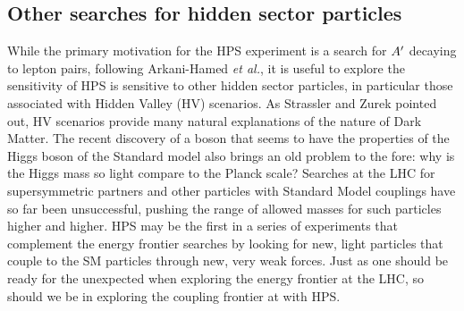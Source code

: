 \subsection{Other searches for hidden sector particles}
\label{sec:hidden_ex}

While the primary motivation for the HPS experiment is a search for $A^\prime$ decaying to lepton pairs, following Arkani-Hamed {\it et al.\/}\cite{ArkaniHamed:2008qn}, it is useful to explore the sensitivity of HPS is sensitive to other hidden sector particles, in particular those associated with Hidden Valley (HV) scenarios. As Strassler and Zurek\cite{Strassler:2006im} pointed out, HV scenarios provide many natural explanations of  the nature of Dark Matter. The recent discovery of a boson that seems to have the properties of the Higgs boson of the Standard model also brings an old problem to the fore: why is the Higgs mass so light compare to the Planck scale? Searches at the LHC for supersymmetric partners and other particles with Standard Model couplings have so far been unsuccessful, pushing the range of allowed masses for such particles higher and higher. HPS may be the first in a series of experiments that complement the energy frontier searches by looking for new, light particles that couple to the SM particles through new, very weak forces. Just as one should be ready for the  unexpected when exploring the energy frontier at the LHC, so should we be in exploring the coupling frontier at with HPS.

